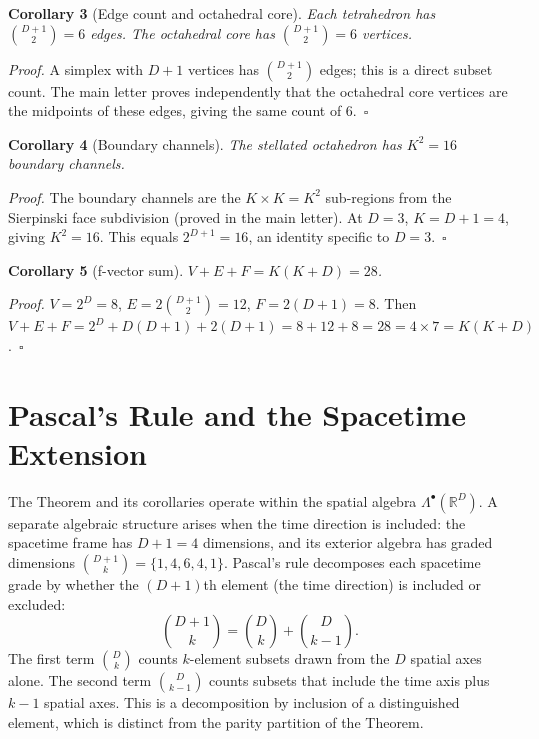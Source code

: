 \documentclass[twocolumn]{iopjournal}
\begin{document}
\vspace{6pt}
\noindent\textbf{Corollary 3} (Edge count and octahedral core). \textit{Each tetrahedron has $\binom{D+1}{2} = 6$ edges. The octahedral core has $\binom{D+1}{2} = 6$ vertices.}

\noindent\textit{Proof.} A simplex with $D+1$ vertices has $\binom{D+1}{2}$ edges; this is a direct subset count. The main letter proves independently that the octahedral core vertices are the midpoints of these edges, giving the same count of 6.~$\square$

\vspace{6pt}
\noindent\textbf{Corollary 4} (Boundary channels). \textit{The stellated octahedron has $K^2 = 16$ boundary channels.}

\noindent\textit{Proof.} The boundary channels are the $K \times K = K^2$ sub-regions from the Sierpinski face subdivision (proved in the main letter). At $D = 3$, $K = D + 1 = 4$, giving $K^2 = 16$. This equals $2^{D+1} = 16$, an identity specific to $D = 3$.~$\square$

\vspace{6pt}
\noindent\textbf{Corollary 5} (f-vector sum). \textit{$V + E + F = K(K + D) = 28$.}

\noindent\textit{Proof.} $V = 2^D = 8$, $E = 2\binom{D+1}{2} = 12$, $F = 2(D+1) = 8$. Then $V + E + F = 2^D + D(D+1) + 2(D+1) = 8 + 12 + 8 = 28 = 4 \times 7 = K(K+D)$.~$\square$


\section*{Pascal's Rule and the Spacetime Extension}

The Theorem and its corollaries operate within the spatial algebra $\Lambda^\bullet(\mathbb{R}^D)$. A separate algebraic structure arises when the time direction is included: the spacetime frame has $D + 1 = 4$ dimensions, and its exterior algebra has graded dimensions $\binom{D+1}{k} = \{1, 4, 6, 4, 1\}$. Pascal's rule decomposes each spacetime grade by whether the $(D+1)$th element (the time direction) is included or excluded:
\begin{equation}
\binom{D+1}{k} = \binom{D}{k} + \binom{D}{k-1}.
\label{eq:pascal}
\end{equation}
The first term $\binom{D}{k}$ counts $k$-element subsets drawn from the $D$ spatial axes alone. The second term $\binom{D}{k-1}$ counts subsets that include the time axis plus $k-1$ spatial axes. This is a decomposition by inclusion of a distinguished element, which is distinct from the parity partition of the Theorem.
\end{document}
